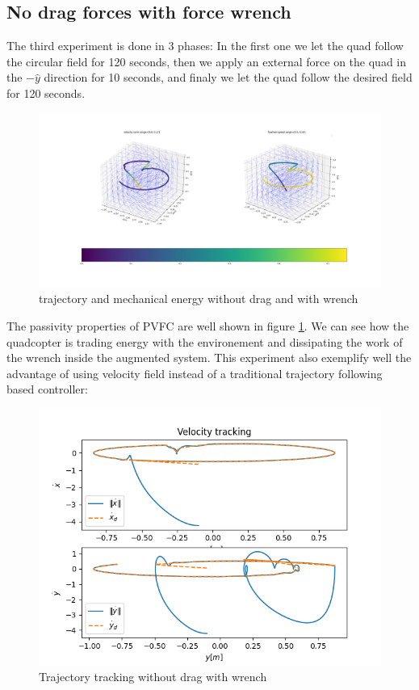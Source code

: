 \subsection{No drag forces with force wrench}
The third experiment is done in 3 phases: In the first one we let the quad follow the circular field for 120 seconds, 
then we apply an external force on the quad in the $-\hat{y}$ direction for 10 seconds,
and finaly we let the quad follow the desired field for 120 seconds.
\begin{figure}[h!]
   \centering
   \includegraphics[width=\linewidth]{Images/python-nodrag-wrench.png}
   \caption{trajectory and mechanical energy without drag and with wrench }
   \label{fig:pythonnodragwrench}
\end{figure}
The passivity properties of PVFC are well shown in figure \ref{fig:pythonnodragwrench}. We can see how the quadcopter is trading energy with the environement and dissipating the work of the wrench inside the augmented system.
This experiment also exemplify well the advantage of using velocity field instead of a traditional trajectory following based controller:
\begin{figure}[h!]
   \centering
   \includegraphics[width=\linewidth]{Images/velocitytrackingpythonnodragwrench.png}
   \caption{Trajectory tracking without drag with wrench}
   \label{fig:trajtracknodragwrench}
\end{figure}
